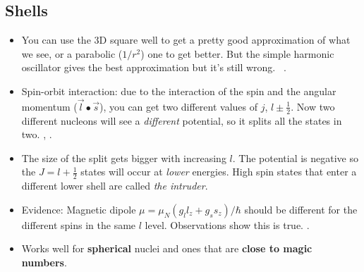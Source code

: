 \documentclass[letter]{article}
\begin{document}
\subsection*{Shells}
\begin{itemize}
\item You can use the 3D square well to get a pretty good
  approximation of what we see, or a parabolic ($1/r^2$) one to get
  better. But the simple harmonic oscillator gives the best
  approximation but it's still wrong. ~\cite[Lec. 12]{lecture}.
\item Spin-orbit interaction: due to the interaction of the spin and
  the angular momentum ($\vec{l}\bullet\vec{s}$), you can get two
  different values of $j$, $l \pm \frac{1}{2}$. Now two different
  nucleons will see a \textit{different} potential, so it splits all
  the states in two. \cite[Lec. 13-16]{lecture},
  \cite[pp. 123-125]{krane}.
\item The size of the split gets bigger with increasing $l$. The
  potential is negative so the $J=l+\frac{1}{2}$ states will occur at
  \textit{lower} energies. High spin states that enter a different lower shell are called \textit{the
  intruder}. \cite[Lec. 13-16]{lecture}
\item Evidence: Magnetic dipole $\mu=\mu_N(g_ll_z + g_ss_z)/\hbar$
  should be different for the different spins in the same $l$
  level. Observations show this is true. \cite[Lec. 13-16]{lecture}.
\item Works well for \textbf{spherical} nuclei and ones that are
  \textbf{close to magic numbers}.
\end{itemize}
\end{document}
